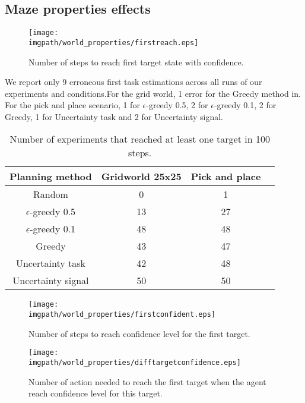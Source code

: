 


\subsection{Maze properties effects}

\begin{figure}[!ht]
\centering
\texttt{[image: \\imgpath/world\_properties/firstreach.eps]}
\caption{Number of steps to reach first target state with confidence.}
\label{fig:wordlpropertiestimefirst}
\end{figure}

We report only 9 erroneous first task estimations across all runs of our experiments and conditions.For the grid world, 1 error for the Greedy method in. For the pick and place scenario, 1 for $\epsilon$-greedy 0.5, 2 for $\epsilon$-greedy 0.1, 2 for Greedy, 1 for Uncertainty task and 2 for Uncertainty signal.

\begin{table}[!ht]
\centering
{}
\begin{tabular}{c c c c}
    Planning method & Gridworld 25x25 &  Pick and place \\ \hline
    Random & 0 & 1 \\ 
    $\epsilon$-greedy 0.5 & 13 & 27 \\
    $\epsilon$-greedy 0.1 & 48 & 48 \\
    Greedy & 43 & 47 \\
    Uncertainty task & 42 & 48 \\
    Uncertainty signal & 50 & 50 \\
\end{tabular}
\caption{Number of experiments that reached at least one target in 100 steps.}
\label{tab:}
\end{table}

\begin{figure}[!ht]
\centering
\texttt{[image: \\imgpath/world\_properties/firstconfident.eps]}
\caption{Number of steps to reach confidence level for the first target.}
\label{fig:wordlpropertiesconfidencefirst}
\end{figure} 

\begin{figure}[!ht]
\centering
\texttt{[image: \\imgpath/world\_properties/difftargetconfidence.eps]}
\caption{Number of action needed to reach the first target when the agent reach confidence level for this target.}
\label{fig:wordlpropertiestargetdist}
\end{figure} 

